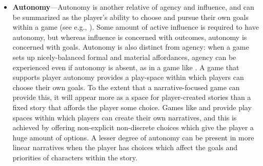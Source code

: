 \begin{itemize}
\item \textbf{Autonomy}---Autonomy is another relative of agency and influence, and can be summarized as the player's ability to choose and pursue their own goals within a game (see e.g., \citep{Ryan2006}).
%
Some amount of active influence is required to have autonomy, but whereas influence is concerned with outcomes, autonomy is concerned with goals.
%
Autonomy is also distinct from agency: when a game sets up nicely-balanced formal and material affordances, agency can be experienced even if autonomy is absent, as in a game like .
%
A game that supports player autonomy provides a play-space within which players can choose their own goals.
%
To the extent that a narrative-focused game can provide this, it will appear more as a space for player-created stories than a fixed story that affords the player some choice.
%
Games like  \citep{SimCity} and  \citep{TheSims} provide play spaces within which players can create their own narratives, and this is achieved by offering non-explicit non-discrete choices which give the player a huge amount of options.
%
A lesser degree of autonomy can be present in more linear narratives when the player has choices which affect the goals and priorities of characters within the story.



\end{itemize}
